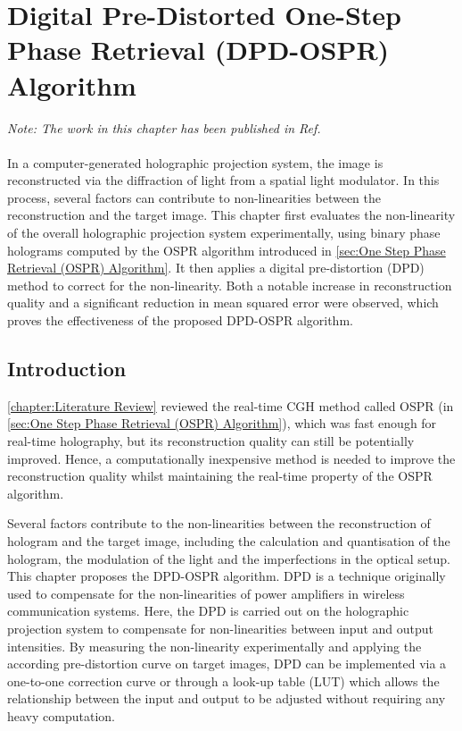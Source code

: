 \chapter{Digital Pre-Distorted One-Step Phase Retrieval (DPD-OSPR) Algorithm} \label{chapter:Digital Pre-Distorted One-Step Phase Retrieval (DPD-OSPR) Algorithm}

\graphicspath{{Chapter_DPD_OSPR/Figs/}}

\textit{Note: The work in this chapter has been published in Ref. \cite{Sha2023DPD}}\\\\

In a computer-generated holographic projection system, the image is reconstructed via the diffraction of light from a spatial light modulator. In this process, several factors can contribute to non-linearities between the reconstruction and the target image. This chapter first evaluates the non-linearity of the overall holographic projection system experimentally, using binary phase holograms computed by the OSPR algorithm introduced in \cref{sec:One Step Phase Retrieval (OSPR) Algorithm}. It then applies a digital pre-distortion (DPD) method to correct for the non-linearity. Both a notable increase in reconstruction quality and a significant reduction in mean squared error were observed, which proves the effectiveness of the proposed DPD-OSPR algorithm.


\section{Introduction}
\cref{chapter:Literature Review} reviewed the real-time CGH method called OSPR (in \cref{sec:One Step Phase Retrieval (OSPR) Algorithm}), which was fast enough for real-time holography, but its reconstruction quality can still be potentially improved. Hence, a computationally inexpensive method is needed to improve the reconstruction quality whilst maintaining the real-time property of the OSPR algorithm.

Several factors contribute to the non-linearities between the reconstruction of hologram and the target image, including the calculation and quantisation of the hologram, the modulation of the light and the imperfections in the optical setup. This chapter proposes the DPD-OSPR algorithm. DPD is a technique originally used to compensate for the non-linearities of power amplifiers in wireless communication systems. Here, the DPD is carried out on the holographic projection system to compensate for non-linearities between input and output intensities. By measuring the non-linearity experimentally and applying the according pre-distortion curve on target images, DPD can be implemented via a one-to-one correction curve or through a look-up table (LUT) which allows the relationship between the input and output to be adjusted without requiring any heavy computation.


